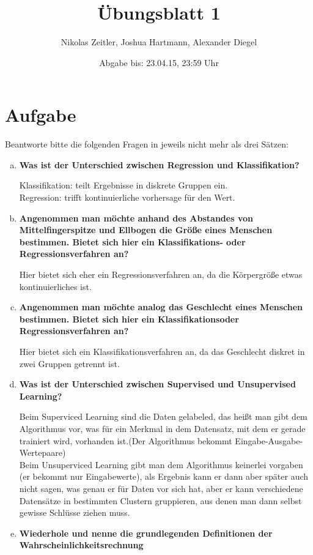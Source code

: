 \documentclass[a4paper]{scrartcl}
\author{Nikolas Zeitler, Joshua Hartmann, Alexander Diegel}
\title{Übungsblatt 1}
\date{Abgabe bis: 23.04.15, 23:59 Uhr}
\begin{document}
\maketitle
\vspace{400px}
\newpage
\section{Aufgabe}
Beantworte bitte die folgenden Fragen in jeweils nicht mehr als drei Sätzen:
\begin{enumerate}[a)]
	\item \textbf{Was ist der Unterschied zwischen Regression und Klassifikation?}
	
	Klassifikation: teilt Ergebnisse in diskrete Gruppen ein.\\
	Regression: trifft kontinuierliche vorhersage für den Wert.
	
	\item \textbf{Angenommen man möchte anhand des Abstandes von Mittelfingerspitze und Ellbogen die Größe eines Menschen bestimmen. Bietet sich hier ein Klassifikations- oder Regressionsverfahren an?}
	
	Hier bietet sich eher ein Regressionsverfahren an, da die Körpergröße etwas kontinuierliches ist.
	
	\item \textbf{Angenommen man möchte analog das Geschlecht eines Menschen bestimmen. Bietet sich hier ein Klassifikationsoder Regressionsverfahren an?}
	
	Hier bietet sich ein Klassifikationsverfahren an, da das Geschlecht diskret in zwei Gruppen getrennt ist.
	
	\item \textbf{Was ist der Unterschied zwischen Supervised und Unsupervised Learning?}
	
	Beim Superviced Learning sind die Daten gelabeled, das heißt man gibt dem Algorithmus vor, was für ein Merkmal in dem Datensatz, mit dem er gerade trainiert wird, vorhanden ist.(Der Algorithmus bekommt Eingabe-Ausgabe-Wertepaare)\\
	Beim Unsuperviced Learning gibt man dem Algorithmus keinerlei vorgaben (er bekommt nur Eingabewerte), als Ergebnis kann er dann aber später auch nicht sagen, was genau er für Daten vor sich hat, aber er kann verschiedene Datensätze in bestimmten Clustern gruppieren, aus denen man dann selbst gewisse Schlüsse ziehen muss.
	
	\item \textbf{Wiederhole und nenne die grundlegenden Definitionen der Wahrscheinlichkeitsrechnung}
	

\end{enumerate}
\end{document}
